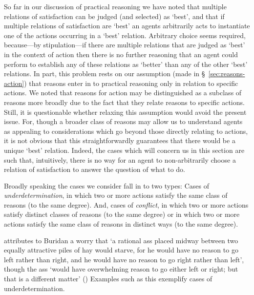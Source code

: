 \documentclass[10pt]{article}
\begin{document}
So far in our discussion of practical reasoning we have noted that multiple relations of satisfaction can be judged (and selected) as `best', and that if multiple relations of satisfaction are `best' an agents arbitrarily acts to instantiate one of the actions occurring in a `best' relation.
Arbitrary choice seems required, because---by stipulation---if there are multiple relations that are judged as `best' in the context of action then there is no further reasoning that an agent could perform to establish any of these relations as `better' than any of the other `best' relations.
In part, this problem rests on our assumption (made in \S~\ref{sec:reasons-action}) that reasons enter in to practical reasoning only in relation to specific actions.
We noted that reasons for action may be distinguished as a subclass of reasons more broadly due to the fact that they relate reasons to specific actions.
Still, it is questionable whether relaxing this assumption would avoid the present issue.
For, though a broader class of reasons may allow us to understand agents as appealing to considerations which go beyond those directly relating to actions, it is not obvious that this straightforwardly guarantees that there would be a unique `best' relation.
Indeed, the cases which will concern us in this section are such that, intuitively, there is no way for an agent to non-arbitrarily choose a relation of satisfaction to answer the question of what to do.

Broadly speaking the cases we consider fall in to two types:
Cases of \emph{underdetermination}, in which two or more actions satisfy the same class of reasons (to the same degree).
And, cases of \emph{conflict}, in which two or more actions satisfy distinct classes of reasons (to the same degree) or in which two or more actions satisfy the same class of reasons in distinct ways (to the same degree).

\citeauthor{Bratman:1987aa} attributes to Buridan a worry that `a rational ass placed midway between two equally attractive piles of hay would starve, for he would have no reason to go left rather than right, and he would have no reason to go right rather than left', though the ass `would have overwhelming reason to go either left or right; but that is a different matter' (\citeyear[11]{Bratman:1987aa})
Examples such as this exemplify cases of underdetermination.
\end{document}
